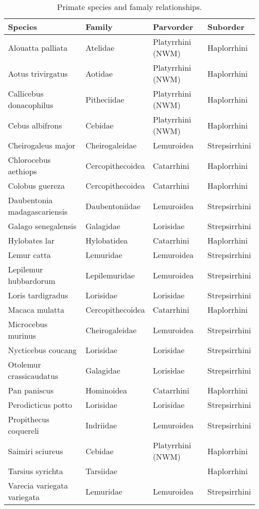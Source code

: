 \begin{table}[h!]
\centering
\caption{\small Primate species and famaly relationships.}
\begin{tabular}{l l l l}
\hline
\textbf{Species} & \textbf{Family} & \textbf{Parvorder} & \textbf{Suborder} \\ 
\hline
Alouatta palliata & Atelidae & Platyrrhini (NWM) & Haplorrhini \\
Aotus trivirgatus & Aotidae & Platyrrhini (NWM) & Haplorrhini \\
Callicebus donacophilus & Pitheciidae & Platyrrhini (NWM) & Haplorrhini \\
Cebus albifrons & Cebidae & Platyrrhini (NWM) & Haplorrhini \\
Cheirogaleus major & Cheirogaleidae & Lemuroidea & Strepsirrhini \\
Chlorocebus aethiops & Cercopithecoidea & Catarrhini & Haplorrhini \\
Colobus guereza & Cercopithecoidea & Catarrhini & Haplorrhini \\
Daubentonia madagascariensis & Daubentoniidae & Lemuroidea & Strepsirrhini \\
Galago senegalensis & Galagidae & Lorisidae & Strepsirrhini \\
Hylobates lar & Hylobatidea & Catarrhini & Haplorrhini \\
Lemur catta & Lemuridae & Lemuroidea & Strepsirrhini \\
Lepilemur hubbardorum & Lepilemuridae & Lemuroidea & Strepsirrhini \\
Loris tardigradus & Lorisidae & Lorisidae & Strepsirrhini \\
Macaca mulatta & Cercopithecoidea & Catarrhini & Haplorrhini \\
Microcebus murinus & Cheirogaleidae & Lemuroidea & Strepsirrhini \\
Nycticebus coucang & Lorisidae & Lorisidae & Strepsirrhini \\
Otolemur crassicaudatus & Galagidae & Lorisidae & Strepsirrhini \\
Pan paniscus & Hominoidea & Catarrhini & Haplorrhini \\
Perodicticus potto & Lorisidae & Lorisidae & Strepsirrhini \\
Propithecus coquereli & Indriidae & Lemuroidea & Strepsirrhini \\
Saimiri sciureus & Cebidae & Platyrrhini (NWM) & Haplorrhini \\
Tarsius syrichta & Tarsiidae &  & Haplorrhini \\
Varecia variegata variegata & Lemuridae & Lemuroidea & Strepsirrhini \\
\hline
\end{tabular}
\label{tab:primates}
\end{table}




